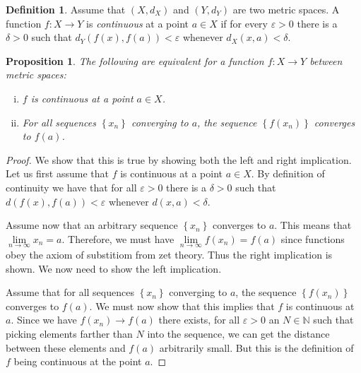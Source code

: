 \documentclass[a4paper]{report}
\newtheorem{prp}{Proposition}
\theoremstyle{definition}
\newtheorem{defn}{Definition}
\begin{document}
\begin{defn}
  Assume that $(X, d_{X})$ and $(Y, d_{Y})$ are two metric spaces. A function
  $f : X \rightarrow Y$ is \textit{continuous} at a point $a \in X$ if for
  every $\varepsilon > 0$ there is a $\delta > 0$ such that $d_{Y}(f(x), f(a))
  < \varepsilon$ whenever $d_{X}(x, a) < \delta$.
\end{defn}

\begin{prp}
  The following are equivalent for a function $f : X \rightarrow Y$ between metric spaces:
  \begin{enumerate}[(i)]
    \item $f$ is continuous at a point $a \in X$.
    \item For all sequences $\left\{ x_n \right\}$ converging to $a$, the sequence $\left\{ f(x_n) \right\}$ converges
      to $f(a)$.
  \end{enumerate}
\end{prp}

\begin{proof}
  We show that this is true by showing both the left and right implication.
  Let us first assume that $f$ is continuous at a point $a \in X$. By
  definition of continuity we have that for all $\varepsilon > 0$ there is a
  $\delta > 0$ such that $d(f(x), f(a)) < \varepsilon$ whenever $d(x, a) <
  \delta$.

  Assume now that an arbitrary sequence $\left\{ x_n \right\}$ converges to
  $a$. This means that $\lim\limits_{n\rightarrow\infty} x_n = a$.  Therefore,
  we must have $\lim\limits_{n\rightarrow\infty} f(x_n) = f(a)$ since functions
  obey the axiom of substitiom from zet theory. Thus the right implication is shown.
  We now need to show the left implication.

  Assume that for all sequences $\left\{ x_n \right\}$ converging to $a$, the
  sequence $\left\{ f(x_n) \right\}$ converges to $f(a)$.  We must now show
  that this implies that $f$ is continuous at $a$. Since we have $f(x_n) \rightarrow f(a)$
  there exists, for all $\varepsilon > 0$ an $N \in \mathbb{N}$ such that picking elements farther
  than $N$ into the sequence, we can get the distance between these elements and $f(a)$ arbitrarily small.
  But this is the definition of $f$ being continuous at the point $a$.
\end{proof}
\end{document}
